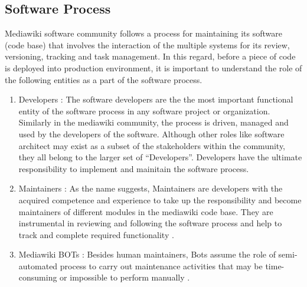 \subsection{Software Process}
\indent Mediawiki software community follows a process for maintaining its software (code base) that involves the interaction of the multiple systems for its review, versioning, tracking and task management. In this regard, before a piece of code is deployed into production environment, it is important to understand the role of the following entities as a part of the software process. 
\begin{enumerate}
\item Developers : The software developers are the the most important functional entity of the software process in any software project or organization. Similarly in the mediawiki community, the process is driven, managed and used by the developers of the software. Although other roles like software architect may exist as a subset of the stakeholders within the community, they all belong to the larger set of \enquote{Developers}. Developers have the ultimate responsibility to implement and mainitain the software process.
\item Maintainers : As the name suggests, Maintainers are developers with the acquired competence and experience to take up the responsibility and become maintainers of different modules in the mediawiki code base. They are instrumental in reviewing and following the software process and help to track and complete required functionality \cite{Maintainers_2014}.
\item Mediawiki BOTs : Besides human maintainers, Bots assume the role of semi-automated process to carry out maintenance activities that may be time-consuming or impossible to perform manually \cite{Bots_2007}.
\end{enumerate}


